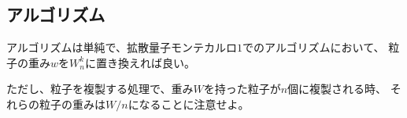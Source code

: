\documentclass[dvipdfmx]{beamer}
\begin{document}
    \subsection{アルゴリズム}
    \begin{frame}{\insertsubsection}
      アルゴリズムは単純で、拡散量子モンテカルロ$1$でのアルゴリズムにおいて、
      粒子の重み$w$を$W_n^k$に置き換えれば良い。

      ただし、粒子を複製する処理で、重み$W$を持った粒子が$n$個に複製される時、
      それらの粒子の重みは$W/n$になることに注意せよ。
    \end{frame}
\end{document}
